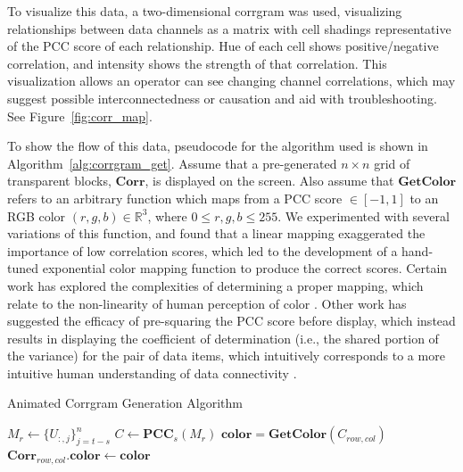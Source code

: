 To visualize this data, a two-dimensional corrgram was used, visualizing relationships between data channels as a matrix with cell shadings representative of the PCC score of each relationship. Hue of each cell shows positive/negative correlation, and intensity shows the strength of that correlation. This visualization allows an operator can see changing channel correlations, which may suggest possible interconnectedness or causation and aid with troubleshooting. See Figure~\ref{fig:corr_map}.

To show the flow of this data, pseudocode for the algorithm used is shown in Algorithm~\ref{alg:corrgram_get}. Assume that a pre-generated $n \times n$ grid of transparent blocks, $\textbf{Corr}$, is displayed on the screen. Also assume that $\textbf{GetColor}$ refers to an arbitrary function which maps from a PCC score $\in [-1,1]$ to an RGB color $(r, g, b) \in \mathbb{R}^{3}$, where $0 \leq r, g, b \leq 255$. We experimented with several variations of this function, and found that a linear mapping exaggerated the importance of low correlation scores, which led to the development of a hand-tuned exponential color mapping function to produce the correct scores. Certain work has explored the complexities of determining a proper mapping, which relate to the non-linearity of human perception of color \cite{friendly2002corrgrams}. Other work has suggested the efficacy of pre-squaring the PCC score before display, which instead results in displaying the coefficient of determination (i.e., the shared portion of the variance) for the pair of data items, which intuitively corresponds to a more intuitive human understanding of data connectivity \cite{rummelcorrelation}.

\begin{algorithm}
    \caption{Animated Corrgram Generation Algorithm}\label{alg:corrgram_get}
    \begin{algorithmic}[1]
        \State $M_{r} \gets \{U_{:,j}\}_{j=t-s}^{n}$ 
        \State $C\gets \textbf{PCC}_{s}(M_{r})$ 
                \State $\textbf{color} = \textbf{GetColor}(C_{row, col})$ 
                \State $\textbf{Corr}_{row, col}\textbf{.color} \gets \textbf{color}$ 
            \EndFor
        \EndFor
        \EndProcedure {}
    \end{algorithmic}
\end{algorithm}

